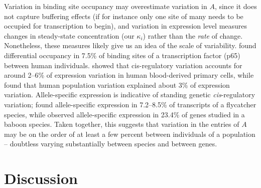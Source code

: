 \documentclass{article}
\newcommand{\1}{\mathbbm{1}}
\begin{document}
Variation in binding site occupancy may overestimate variation in $A$,
since it does not capture buffering effects (if for instance only one site of many needs to be occupied for transcription to begin),
and variation in expression level measures changes in steady-state concentration (our $\kappa_i$) rather than the \emph{rate} of change.
Nonetheless, these measures likely give us an idea of the scale of variability.
\citet{kasowski2010variation} found differential occupancy in 7.5\%
of binding sites of a transcription factor (p65) between human individuals.
\citet{verlaan2009targeted} showed that cis-regulatory variation
accounts for around 2--6\% of expression variation in human blood-derived primary cells,
while \citet{lappalainen2013transcriptome} found that human population variation 
explained about 3\% of expression variation.
Allele-specific expression is indicative of standing genetic \emph{cis}-regulatory variation;
\citet{wang2017bayesian} found allele-specific expression in 7.2--8.5\% of transcripts of a flycatcher species,
while \citet{tung2015genetic} observed allele-specific expression in 23.4\% of genes studied in a baboon species. 
Taken together, this suggests that variation in the entries of $A$
may be on the order of at least a few percent between individuals of a population --
doubtless varying substantially between species and between genes.

\section*{Discussion}

\end{document}
